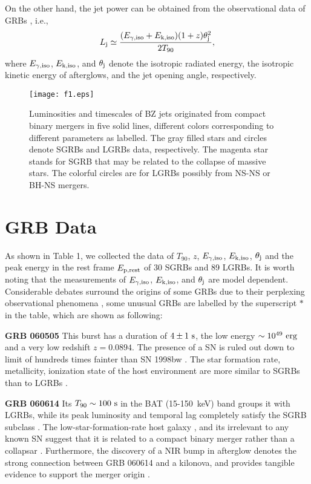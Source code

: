 \documentclass[a4paper,fleqn,usenatbib]{mnras}
\def\beq{\begin{eqnarray}}
\def\eeq{\end{eqnarray}}
\begin{document}
On the other hand, the jet power can be obtained from the observational data of GRBs \citep[e.g.,][]{Fan2011,Liu2015b,Song2016}, i.e.,
\beq
L_{\rm j}\simeq\frac{(E_{\rm \gamma,\rm iso} + E_{\rm k,\rm iso})(1+z)\theta_{\rm j}^{2}}{2 T_{90}},
\eeq
where $E_{\rm \gamma,\rm iso}$, $E_{\rm k,\rm iso}$, and $\theta_{\rm j}$ denote the isotropic radiated energy, the isotropic kinetic energy of afterglows, and the jet opening angle, respectively.

\begin{figure}
\texttt{[image: f1.eps]}
\caption{Luminosities and timescales of BZ jets originated from compact binary mergers in five solid lines, different colors corresponding to different parameters as labelled. The gray filled stars and circles denote SGRBs and LGRBs data, respectively. The magenta star stands for SGRB that may be related to the collapse of massive stars. The colorful circles are for LGRBs possibly from NS-NS or BH-NS mergers.}
\end{figure}

\section{GRB Data}

As shown in Table 1, we collected the data of $T_{90}$, $z$, $E_{\rm \gamma,\rm iso}$, $E_{\rm k,\rm iso}$, $\theta_{\rm j}$ and the peak energy in the rest frame $E_{\rm p, rest}$ of 30 SGRBs and 89 LGRBs. It is worth noting that the measurements of $E_{\rm \gamma,\rm iso}$, $E_{\rm k,\rm iso}$, and $\theta_{\rm j}$ are model dependent. Considerable debates surround the origins of some GRBs due to their perplexing observational phenomena \citep[e.g.,][]{Zhang2009,Xin2011,Kann2011,Li2016}, some unusual GRBs are labelled by the superscript $*$ in the table, which are shown as following:

\textbf{GRB 060505} This burst has a duration of $4\pm1\rm~s$, the low energy $\sim 10^{49} \rm~erg$ and a very low redshift $z=0.0894$. The presence of a SN is ruled out down to limit of hundreds times fainter than SN 1998bw \citep[]{Ofek2007,Fynbo2006}. The star formation rate, metallicity, ionization state of the host environment are more similar to SGRBs than to LGRBs \citep[]{Levesque2007}.

\textbf{GRB 060614} Its $T_{90}\sim100 \rm~s$ in the BAT (15-150~keV) band groups it with LGRBs, while its peak luminosity and temporal lag completely satisfy the SGRB subclass \citep[]{Gehrels2006}. The low-star-formation-rate host galaxy \citep[]{Savaglio2009}, and its irrelevant to any known SN \citep[]{GalYam2006,Fynbo2006,DellaValle2006} suggest that it is related to a compact binary merger rather than a collapsar \citep[e.g.,][]{Zhang2007a}. Furthermore, the discovery of a NIR bump in afterglow denotes the strong connection between GRB 060614 and a kilonova, and provides tangible evidence to support the merger origin \citep[]{Yang2015,Jin2015,Horesh2016}.
\end{document}
